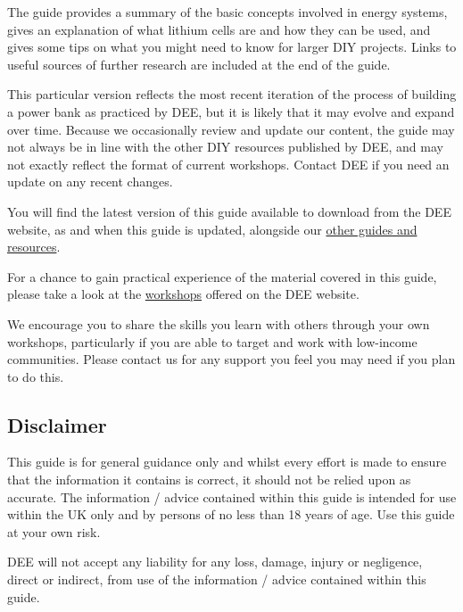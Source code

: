 \documentclass{article}
\theoremstyle{definition}
\theoremstyle{definition}
\theoremstyle{remark}
\begin{document}
    The guide provides a summary of the basic concepts involved in energy systems, gives an explanation of what lithium cells are and how they can be used, and gives some tips on what you might need to know for larger DIY projects. Links to useful sources of further research are included at the end of the guide.
    
    This particular version reflects the most recent iteration of the process of building a power bank as practiced by DEE, but it is likely that it may evolve and expand over time. Because we occasionally review and update our content, the guide may not always be in line with the other DIY resources published by DEE, and may not exactly reflect the format of current workshops. Contact DEE if you need an update on any recent changes. 
    
    You will find the latest version of this guide available to download from the DEE website, as and when this guide is updated, alongside our \href{https://www.demandenergyequality.org/resources/}{other guides and resources}.
    
    For a chance to gain practical experience of the material covered in this guide, please take a look at the \href{https://www.demandenergyequality.org/our-workshops/}{workshops} offered on the DEE website.
    
    We encourage you to share the skills you learn with others through your own workshops, particularly if you are able to target and work with low-income communities. Please contact us for any support you feel you may need if you plan to do this.
  
  
  \subsection{Disclaimer} %
  \label{sub:disclaimer}

    This guide is for general guidance only and whilst every effort is made to ensure that the information it contains is correct, it should not be relied upon as accurate. The information / advice contained within this guide is intended for use within the UK only and by persons of no less than 18 years of age. Use this guide at your own risk.
    
    DEE will not accept any liability for any loss, damage, injury or negligence, direct or indirect, from use of the information / advice contained within this guide.
  
\end{document}
